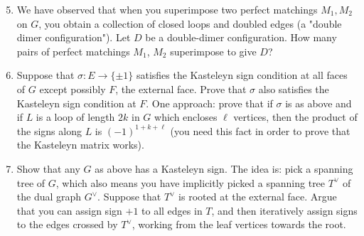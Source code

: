 \documentclass[12pt]{article}
\begin{document}
\begin{enumerate}
        \setcounter{enumi}{4}
	\item We have observed that when you superimpose two perfect matchings  $M_1, M_2$ on $G$, you obtain a collection of closed loops and doubled edges (a "double dimer configuration").  Let $D$ be a double-dimer configuration.  How many pairs of perfect matchings $M_1$, $M_2$ superimpose to give $D$?
	\item Suppose that $\sigma:E \rightarrow \{\pm 1\}$ satisfies the Kasteleyn sign condition at all faces of $G$ except possibly $F$, the external face.  Prove that $\sigma$ also satisfies the Kasteleyn sign condition at $F$.  One approach: prove that if $\sigma$ is as above and if $L$ is a loop of length $2k$ in $G$ which encloses $\ell$ vertices, then the product of the signs along $L$ is $(-1)^{1+k+\ell}$ (you need this fact in order to prove that the Kasteleyn matrix works).
	\item Show that any $G$ as above has a Kasteleyn sign.  The idea is: pick a spanning tree of $G$, which also means you have implicitly picked a spanning tree $T^{\vee}$ of the dual graph $G^{\vee}$.  Suppose that $T^{\vee}$ is rooted at the external face.   Argue that you can assign sign $+1$ to all edges in $T$, and then iteratively assign signs to the edges crossed by $T^{\vee}$, working from the leaf vertices towards the root.
\end{enumerate}
\end{document}
